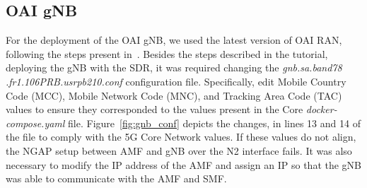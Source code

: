 \begin{table}[H]
    \caption{Deployed 5G Core Network functions IP addresses.}
    \label{tab:ip_core}
    \centering
\end{table}

\begin{table}[H]
    \caption{Deployed data network components IP addresses.}
    \label{tab:ip_dn}
    \centering
\end{table}

\subsection{OAI gNB}\label{subsec:oai-gnb}
For the deployment of the OAI gNB, we used the latest version of OAI RAN, following the steps present in~\cite{openairinterface5g_e2ap}.
Besides the steps described in the tutorial, deploying the gNB with the SDR, it was required changing the \textit{gnb.sa.band78
.fr1.106PRB.usrpb210.conf} configuration file.
Specifically, edit Mobile Country Code (MCC), Mobile Network Code (MNC), and Tracking Area Code (TAC) values to ensure they corresponded to the values present in the Core \textit{docker-compose.yaml} file.
Figure~\ref{fig:gnb_conf} depicts the changes, in lines 13 and 14 of the file to comply with the 5G Core Network values.
If these values do not align, the NGAP setup between AMF and gNB over the N2 interface fails.
It was also necessary to modify the IP address of the AMF and assign an IP so that the gNB was able to communicate with the AMF and SMF\@.

